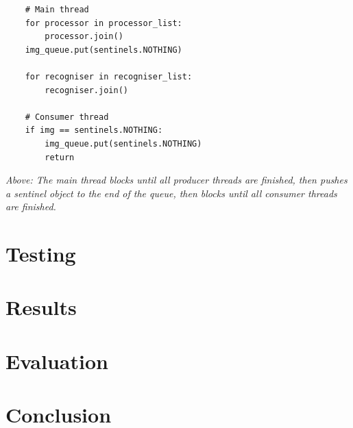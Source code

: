 \documentclass{article}
\begin{document}
\begin{lstlisting}
	# Main thread
    for processor in processor_list:
        processor.join()
    img_queue.put(sentinels.NOTHING)

    for recogniser in recogniser_list:
        recogniser.join()
        
    # Consumer thread
    if img == sentinels.NOTHING:
        img_queue.put(sentinels.NOTHING)
        return
\end{lstlisting}
\textit{Above: The main thread blocks until all producer threads are finished, then pushes a sentinel object to the end of the queue, then blocks until all consumer threads are finished.}

\section{Testing}
\section{Results}
\section{Evaluation}
\section{Conclusion}

\newpage

\end{document}
